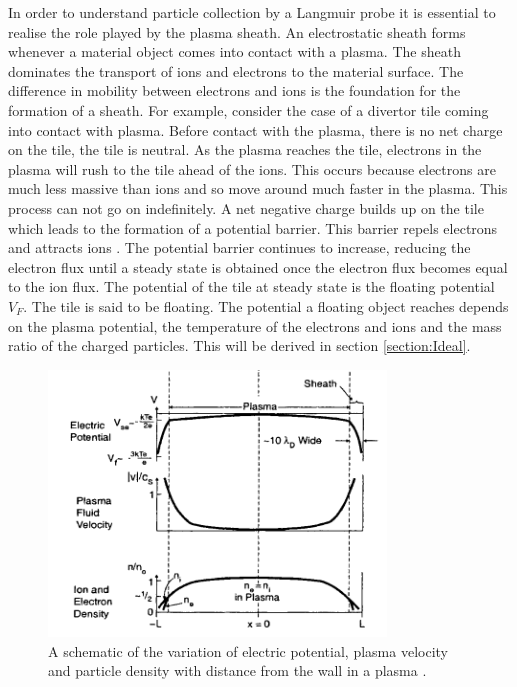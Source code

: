 In order to understand particle collection by a Langmuir probe it is essential to realise the role played by the plasma sheath. An electrostatic sheath forms whenever a material object comes into contact with a plasma. %
The sheath dominates the transport of ions and electrons to the material surface. The difference in mobility between electrons and ions is the foundation for the formation of a sheath. For example, consider the case of a divertor tile coming into contact with plasma. Before contact with the plasma, there is no net charge on the tile, the tile is neutral. As the plasma reaches the tile, electrons in the plasma will rush to the tile ahead of the ions. This occurs because electrons are much less massive than ions and so move around much faster in the plasma. This process can not go on indefinitely. A net negative charge builds up on the tile which leads to the formation of a potential barrier. This barrier repels electrons and attracts ions \cite{sheathformation}. The potential barrier continues to increase, reducing the electron flux until a steady state is obtained once the electron flux becomes equal to the ion flux. The potential of the tile at steady state is the floating potential $V_F$. The tile is said to be floating. The potential a floating object reaches depends on the plasma potential, the temperature of the electrons and ions and the mass ratio of the charged particles. This will be derived in section  \ref{section:Ideal}.
\begin{figure}[H]
\centering
\includegraphics[width=0.8\textwidth]{sheath.png}
\caption{A schematic of the variation of electric potential, plasma velocity and particle density with distance from the wall in a plasma \cite{stangeby-sheath}.}
\label{fig:stangebysheath}
\end{figure} 
